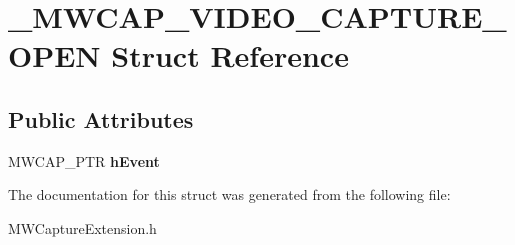 \hypertarget{struct__MWCAP__VIDEO__CAPTURE__OPEN}{\section{\-\_\-\-M\-W\-C\-A\-P\-\_\-\-V\-I\-D\-E\-O\-\_\-\-C\-A\-P\-T\-U\-R\-E\-\_\-\-O\-P\-E\-N Struct Reference}
\label{struct__MWCAP__VIDEO__CAPTURE__OPEN}
}
\subsection*{Public Attributes}
\begin{DoxyCompactItemize}
\item 
\hypertarget{struct__MWCAP__VIDEO__CAPTURE__OPEN_a91abdd33c44f67945771b10b7e77dc1d}{M\-W\-C\-A\-P\-\_\-\-P\-T\-R {\bfseries h\-Event}}\label{struct__MWCAP__VIDEO__CAPTURE__OPEN_a91abdd33c44f67945771b10b7e77dc1d}

\end{DoxyCompactItemize}


The documentation for this struct was generated from the following file\-:\begin{DoxyCompactItemize}
\item 
M\-W\-Capture\-Extension.\-h\end{DoxyCompactItemize}
